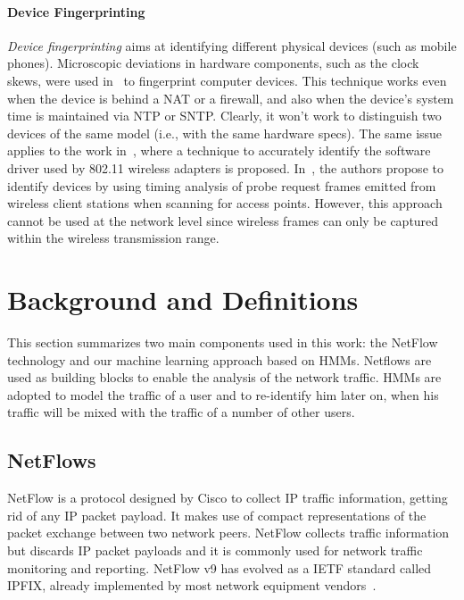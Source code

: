 \documentclass[10pt,conference,compsocconf,letterpaper]{IEEEtran}
\begin{document}
\paragraph{Device Fingerprinting}
\emph{Device fingerprinting} aims at identifying different physical
devices (such as mobile phones).  Microscopic deviations in hardware components, 
such as the clock skews, were used in~\cite{Kohno2005} to fingerprint computer
devices. This technique works even when the device is
behind a NAT or a firewall, and also when the device's system time is
maintained via NTP or SNTP.  Clearly, it won't work to distinguish two 
devices of the same model (i.e., with the same hardware specs). 
The same issue applies to the work in~\cite{Franklin2006}, where a technique to accurately 
identify the software driver used by 802.11 wireless adapters is proposed. 
In~\cite{Desmond2008}, the authors propose to identify devices by using timing analysis 
of probe request frames emitted from wireless client stations when scanning for access
points. However, this approach cannot be used at the network level since wireless frames can 
only be captured within the wireless transmission range.









\section{Background and Definitions}\label{sec:backgr-defin}
This section summarizes two main components used in this work: 
the NetFlow technology and our machine learning approach based on HMMs. 
Netflows are used as building blocks to enable the analysis of the network traffic. 
HMMs are adopted to model the traffic of a user and to re-identify him 
later on, when his traffic will be mixed with the traffic of a number of other users.

\subsection{NetFlows}\label{sec:netflows}
NetFlow is a protocol designed by Cisco to collect IP traffic information, 
getting rid of any IP packet payload. It  makes use of compact
representations of the packet exchange between two network peers. 
NetFlow collects traffic information but discards IP packet payloads
and it is commonly used for network traffic monitoring and reporting.
NetFlow v9 has evolved as a IETF standard called IPFIX, already implemented 
by most network equipment vendors~\cite{B.Claise2008}. 
\end{document}

